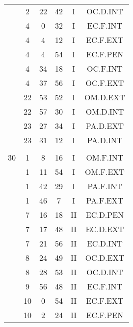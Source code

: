 \documentclass[12pt, a4paper]{article}
\begin{document}
\begin{multicols}{3}
{\begin{tabular}{c c c c c c}
	 	 	 	 & 2 & 22 & 42 & I & OC.D.INT\\%
	 	 	 	 & 4 & 0 & 32 & I & EC.F.INT\\%
	 	 	 	 & 4 & 4 & 12 & I & EC.F.EXT\\%
	 	 	 	 & 4 & 4 & 54 & I & EC.F.PEN\\%
	 	 	 	 & 4 & 34 & 18 & I & OC.F.INT\\%
	 	 	 	 & 4 & 37 & 56 & I & OC.F.EXT\\%
	 	 	 	 & 22 & 53 & 52 & I & OM.D.EXT\\%
	 	 	 	 & 22 & 57 & 30 & I & OM.D.INT\\%
	 	 	 	 & 23 & 27 & 34 & I & PA.D.EXT\\%
	 	 	 	 & 23 & 31 & 12 & I & PA.D.INT\\%
	 	 	 	 & & & & & \\%
	 	 	 	30 & 1 & 8 & 16 & I & OM.F.INT\\%
	 	 	 	 & 1 & 11 & 54 & I & OM.F.EXT\\%
	 	 	 	 & 1 & 42 & 29 & I & PA.F.INT\\%
	 	 	 	 & 1 & 46 & 7 & I & PA.F.EXT\\%
	 	 	 	 & 7 & 16 & 18 & II & EC.D.PEN\\%
	 	 	 	 & 7 & 17 & 48 & II & EC.D.EXT\\%
	 	 	 	 & 7 & 21 & 56 & II & EC.D.INT\\%
	 	 	 	 & 8 & 24 & 49 & II & OC.D.EXT\\%
	 	 	 	 & 8 & 28 & 53 & II & OC.D.INT\\%
	 	 	 	 & 9 & 56 & 48 & II & EC.F.INT\\%
	 	 	 	 & 10 & 0 & 54 & II & EC.F.EXT\\%
	 	 	 	 & 10 & 2 & 24 & II & EC.F.PEN\\%

\end{tabular}}
\end{multicols}
\end{document}
